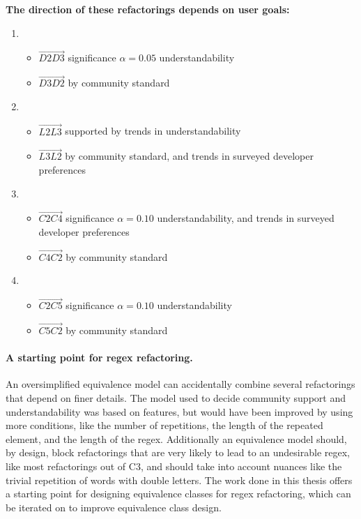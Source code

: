 \textbf{The direction of these refactorings depends on user goals:}
\begin{enumerate}
\item \begin{itemize}
\item   $\overrightarrow{D2 D3}$ significance $\alpha=0.05$ understandability
\item   $\overrightarrow{D3 D2}$ by community standard
\end{itemize}
\item \begin{itemize}
\item   $\overrightarrow{L2 L3}$ supported by trends in understandability
\item   $\overrightarrow{L3 L2}$ by community standard, and trends in surveyed developer preferences
\end{itemize}
\item \begin{itemize}
\item   $\overrightarrow{C2 C4}$ significance $\alpha=0.10$ understandability, and trends in surveyed developer preferences
\item   $\overrightarrow{C4 C2}$ by community standard
\end{itemize}
\item \begin{itemize}
\item   $\overrightarrow{C2 C5}$ significance $\alpha=0.10$ understandability
\item   $\overrightarrow{C5 C2}$ by community standard
\end{itemize}
\end{enumerate}


\paragraph{A starting point for regex refactoring.}  An oversimplified equivalence model can accidentally combine several refactorings that depend on finer details.  The model used to decide community support and understandability was based on features, but would have been improved by using more conditions, like the number of repetitions, the length of the repeated element, and the length of the regex.  Additionally an equivalence model should, by design, block refactorings that are very likely to lead to an undesirable regex, like most refactorings out of C3, and should take into account nuances like the trivial repetition of words with double letters. The work done in this thesis offers a starting point for designing equivalence classes for regex refactoring, which can be iterated on to improve equivalence class design.

